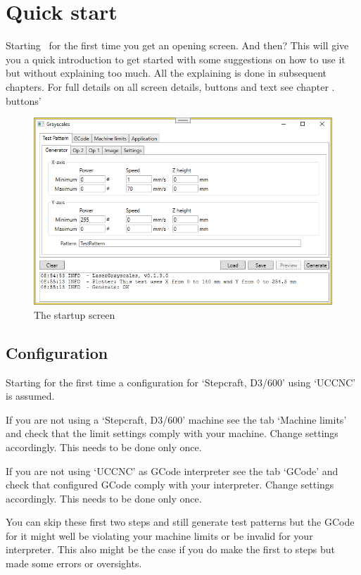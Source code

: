 \chapter{Quick start}\label{QuickStart}

Starting \GS\ for the first time you get an opening screen. And then?
This will give you a quick introduction to get started with some suggestions on how to use it but without explaining too much. All the explaining is done in subsequent chapters.
For full details on all screen details, buttons and text see chapter . buttons'%

\begin{figure}[h!]
    \centering
    \includegraphics[width=0.8\linewidth]{./images/Grayscales-v0.1.3.png}
    \caption{The startup screen}
\end{figure}

\section{Configuration}
Starting for the first time a configuration for `Stepcraft, D3/600' using `UCCNC' is assumed.

If you are not using a `Stepcraft, D3/600' machine see the tab `Machine limits' and check that the limit settings comply with your machine. Change settings accordingly. This needs to be done only once.

If you are not using `UCCNC' as GCode interpreter see the tab `GCode' and check that configured GCode comply with your interpreter. Change settings accordingly. This needs to be done only once.

You can skip these first two steps and still generate test patterns but the GCode for it might well be violating your machine limits or be invalid for your interpreter. This also might be the case
if you do make the first to steps but made some errors or oversights.

